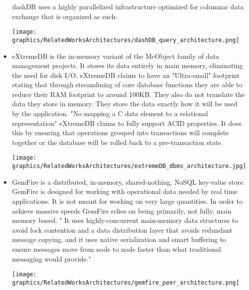\documentclass[letterpaper, 12pt]{article}
\renewcommand{\includegraphics}[2][]{\fbox{}}
\begin{document}
\begin{itemize}
	  dashDB uses a highly parallelized infrastructure optimized for columnar data
	  exchange that is organized as such:
	  \par\vspace{\baselineskip}
	\texttt{[image: graphics/RelatedWorksArchitectures/dashDB\_query\_architecture.png]}
	  \cite{dashDB}
	  \par\vspace{\baselineskip}
	  \item eXtremeDB is the in-memory variant of the McObject family of data management
	  projects.
	  It stores its data entirely in main memory, eliminating the need for disk I/O. 
	  eXtremeDB claims to have an "Ultra-small" footprint stating that through 
	  streamlining of core database functions they are able to reduce their RAM footprint
	  to around 100KB. They also do not translate the data they store in memory. They 
	  store the data exactly how it will be used by the application. "No mapping a C data
	  element to a relational representation"\cite{extremeDB} eXtremeDB claims to fully 
	  support ACID properties. It does this by ensuring that operations grouped into
	  transactions will complete together or the database will be rolled back to a 
	  pre-transaction state.\cite{extremeDB}
	  \par\vspace{\baselineskip}
	\texttt{[image: graphics/RelatedWorksArchitectures/extremeDB\_dbms\_architecture.jpg]}
	  \cite{extremeDB}
	  \par\vspace{\baselineskip}
	  
	  \item GemFire is a distributed, in-memory, shared-nothing, NoSQL key-value store.
	  GemFire is designed for working with operational data needed by real time 
	  applications. It is not meant for working on very large quantities. In order to 
	  achieve massive speeds GemFire relies on being primarily, not fully, 
	  main memory based. " It uses highly-concurrent main-memory data structures to avoid
	  lock contention and a data distribution
	  layer that avoids redundant message copying, and it uses native serialization and
	  smart buffering to ensure messages move from node to node faster than what
	  traditional messaging would provide."\cite{gemfire}
	  \par\vspace{\baselineskip}
	  \texttt{[image: graphics/RelatedWorksArchitectures/gemfire\_peer\_architecture.png]}
	  \par\vspace{\baselineskip}
	  

\end{itemize}
\end{document}
